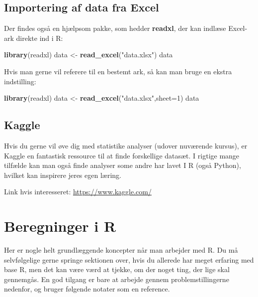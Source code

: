 \documentclass[
]{book}
\newenvironment{Shaded}{\begin{snugshade}}{\end{snugshade}}
\newcommand{\AttributeTok}[1]{\textcolor[rgb]{0.13,0.29,0.53}{#1}}
\newcommand{\DecValTok}[1]{\textcolor[rgb]{0.00,0.00,0.81}{#1}}
\newcommand{\FunctionTok}[1]{\textcolor[rgb]{0.13,0.29,0.53}{\textbf{#1}}}
\newcommand{\NormalTok}[1]{#1}
\newcommand{\OtherTok}[1]{\textcolor[rgb]{0.56,0.35,0.01}{#1}}
\newcommand{\StringTok}[1]{\textcolor[rgb]{0.31,0.60,0.02}{#1}}
\theoremstyle{definition}
\theoremstyle{definition}
\theoremstyle{definition}
\theoremstyle{definition}
\theoremstyle{remark}
\begin{document}
\subsection{Importering af data fra Excel}\label{importering-af-data-fra-excel}

Der findes også en hjælpsom pakke, som hedder \textbf{readxl}, der kan indlæse Excel-ark direkte ind i R:

\begin{Shaded}
\begin{Highlighting}[]
\FunctionTok{library}\NormalTok{(readxl)}
\NormalTok{data }\OtherTok{\textless{}{-}} \FunctionTok{read\_excel}\NormalTok{(}\StringTok{"data.xlsx"}\NormalTok{)}
\NormalTok{data}
\end{Highlighting}
\end{Shaded}

Hvis man gerne vil referere til en bestemt ark, så kan man bruge en ekstra indstilling:

\begin{Shaded}
\begin{Highlighting}[]
\FunctionTok{library}\NormalTok{(readxl)}
\NormalTok{data }\OtherTok{\textless{}{-}} \FunctionTok{read\_excel}\NormalTok{(}\StringTok{"data.xlsx"}\NormalTok{,}\AttributeTok{sheet=}\DecValTok{1}\NormalTok{)}
\NormalTok{data}
\end{Highlighting}
\end{Shaded}

\subsection{Kaggle}\label{kaggle}

Hvis du gerne vil øve dig med statistike analyser (udover nuværende kursus), er Kaggle en fantastisk ressource til at finde forskellige datasæt. I rigtige mange tilfælde kan man også finde analyser some andre har lavet I R (også Python), hvilket kan inspirere jeres egen læring.

Link hvis interesseret: \url{https://www.kaggle.com/}

\section{Beregninger i R}\label{beregninger-i-r}

Her er nogle helt grundlæggende koncepter når man arbejder med R. Du må selvfølgelige gerne springe sektionen over, hvis du allerede har meget erfaring med base R, men det kan være værd at tjekke, om der noget ting, der lige skal gennemgås. En god tilgang er bare at arbejde gennem problemstillingerne nedenfor, og bruger følgende notater som en reference.
\end{document}
